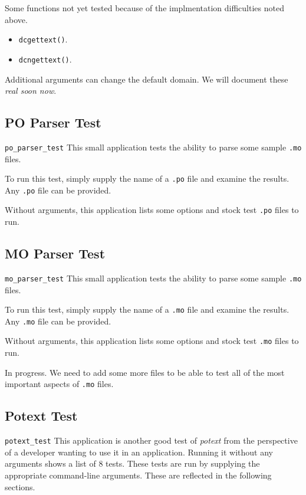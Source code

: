    Some functions not yet tested because of the implmentation difficulties
   noted above.

   \begin{itemize}
      \item \texttt{dcgettext()}.
      \item \texttt{dcngettext()}.
   \end{itemize}

   Additional arguments can change the default domain.
   We will document these \textsl{real soon now}.

\subsection{PO Parser Test}
\label{subsec:potext_Po_parser_test_program}

   \texttt{po\_parser\_test}
   This small application tests the ability to parse some
   sample \texttt{.mo} files.

   To run this test, simply supply the name of a \texttt{.po} file and
   examine the results.
   Any \texttt{.po} file can be provided.

   Without arguments, this application lists some options and stock
   test \texttt{.po} files to run.

\subsection{MO Parser Test}
\label{subsec:potext_mo_parser_test_program}

   \texttt{mo\_parser\_test}
   This small application tests the ability to parse some
   sample \texttt{.mo} files.

   To run this test, simply supply the name of a \texttt{.mo} file and
   examine the results.
   Any \texttt{.mo} file can be provided.

   Without arguments, this application lists some options and stock
   test \texttt{.mo} files to run.

   In progress.
   We need to add some more files to be able to test all of the most
   important aspects of \texttt{.mo} files.

\subsection{Potext Test}
\label{subsec:potext_test_program}

   \texttt{potext\_test}
   This application is another good test of \textsl{potext} from the
   perspective of a developer wanting to use it in an application.
   Running it without any arguments shows a list of 8 tests.
   These tests are run by supplying the appropriate command-line arguments.
   These are reflected in the following sections.

